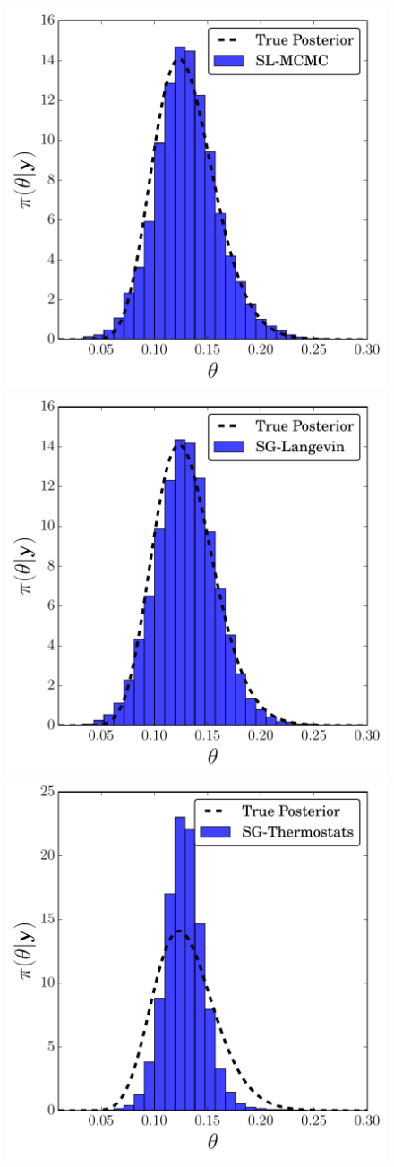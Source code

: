 \documentclass[]{article}
\begin{document}
\begin{figure}[t]
\vskip 0.2in
\begin{center}
\includegraphics[width=0.27\columnwidth]{./images/exp-SL-MCMC-posterior-hist-omega-rate-100p0-chain0.pdf}
\includegraphics[width=0.27\columnwidth]{./images/exp-SG-Langevin-posterior-hist-omega-rate-100p0-chain0.pdf}
\includegraphics[width=0.27\columnwidth]{./images/exponential/exp3-SG-Thermostats-posterior-hist-omega-rate-100p0-chain0.pdf}


\end{center}
\end{figure}
\end{document}
